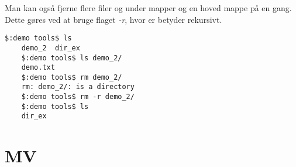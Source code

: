 Man kan også fjerne flere filer og under mapper og en hoved mappe på en gang. Dette gøres ved at bruge flaget \textit{-r}, hvor er betyder rekursivt.
\begin{lstlisting}[title=rmdir -r eksempel]	
	$:demo tools$ ls 
	demo_2	dir_ex
	$:demo tools$ ls demo_2/
	demo.txt
	$:demo tools$ rm demo_2/
	rm: demo_2/: is a directory
	$:demo tools$ rm -r demo_2/
	$:demo tools$ ls
	dir_ex
\end{lstlisting}

\section{MV}

